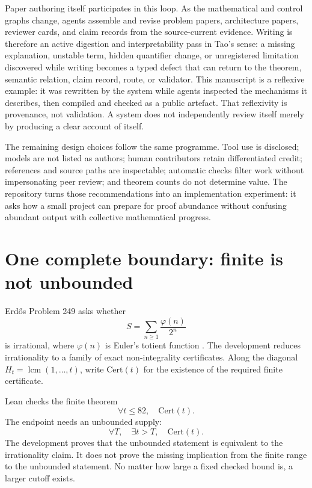 \documentclass[10pt]{article}
\begin{document}
Paper authoring itself participates in this loop. As the mathematical and
control graphs change, agents assemble and revise problem papers, architecture
papers, reviewer cards, and claim records from the source-current evidence.
Writing is therefore an active digestion and interpretability pass in Tao's
sense: a missing explanation, unstable term, hidden quantifier change, or
unregistered limitation discovered while writing becomes a typed defect that
can return to the theorem, semantic relation, claim record, route, or validator.
This manuscript is a reflexive example: it was rewritten by the system while
agents inspected the mechanisms it describes, then compiled and checked as a
public artefact. That reflexivity is provenance, not validation. A system does
not independently review itself merely by producing a clear account of itself.

The remaining design choices follow the same programme. Tool use is disclosed;
models are not listed as authors; human contributors retain differentiated
credit; references and source paths are inspectable; automatic checks filter
work without impersonating peer review; and theorem counts do not determine
value. The repository turns those recommendations into an implementation
experiment: it asks how a small project can
prepare for proof abundance without confusing abundant output with collective
mathematical progress.

\section{One complete boundary: finite is not unbounded}\label{sec:example}

Erd\H{o}s Problem 249 asks whether
\[
S=\sum_{n\ge1}\frac{\varphi(n)}{2^n}
\]
is irrational, where \(\varphi(n)\) is Euler's totient function
\cite{erdosgraham}. The development reduces irrationality to a family of exact
non-integrality certificates. Along the diagonal
\(H_t=\operatorname{lcm}(1,\ldots,t)\), write \(\mathrm{Cert}(t)\) for the
existence of the required finite certificate.

Lean checks the finite theorem
\[
\forall t\le82,\quad \mathrm{Cert}(t).
\]
The endpoint needs an unbounded supply:
\[
\forall T,\quad \exists t>T,\quad \mathrm{Cert}(t).
\]
The development proves that the unbounded statement is equivalent to the
irrationality claim. It does not prove the missing implication from the finite
range to the unbounded statement. No matter how large a fixed checked bound is,
a larger cutoff exists.
\end{document}
